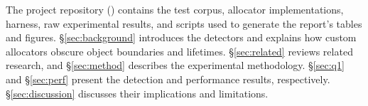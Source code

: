 The project repository (\repourl) contains the test corpus, allocator implementations, harness, raw experimental results, and scripts used to generate the report's tables and figures. \S\ref{sec:background} introduces the detectors and explains how custom allocators obscure object boundaries and lifetimes. \S\ref{sec:related} reviews related research, and \S\ref{sec:method} describes the experimental methodology. \S\ref{sec:q1} and \S\ref{sec:perf} present the detection and performance results, respectively. \S\ref{sec:discussion} discusses their implications and limitations.
